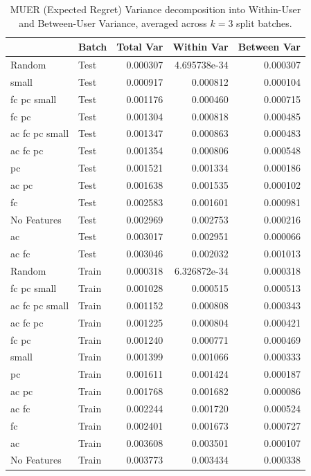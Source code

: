 \begin{table}[H]
\centering
\begin{tabular}{llrrr}
\toprule
           {} &  Batch &  Total Var &    Within Var &  Between Var \\
\midrule
         Random &   Test &   0.000307 &  4.695738e-34 &     0.000307 \\
          small &   Test &   0.000917 &  0.000812 &     0.000104 \\
    fc pc small &   Test &   0.001176 &  0.000460 &     0.000715 \\
         fc pc  &   Test &   0.001304 &  0.000818 &     0.000485 \\
 ac fc pc small &   Test &   0.001347 &  0.000863 &     0.000483 \\
      ac fc pc  &   Test &   0.001354 &  0.000806 &     0.000548 \\
            pc  &   Test &   0.001521 &  0.001334 &     0.000186 \\
         ac pc  &   Test &   0.001638 &  0.001535 &     0.000102 \\
            fc  &   Test &   0.002583 &  0.001601 &     0.000981 \\
    No Features &   Test &   0.002969 &  0.002753 &     0.000216 \\
            ac  &   Test &   0.003017 &  0.002951 &     0.000066 \\
         ac fc  &   Test &   0.003046 &  0.002032 &     0.001013 \\
\midrule
         Random &  Train &   0.000318 &  6.326872e-34 &     0.000318 \\
    fc pc small &  Train &   0.001028 &  0.000515 &     0.000513 \\
 ac fc pc small &  Train &   0.001152 &  0.000808 &     0.000343 \\
      ac fc pc  &  Train &   0.001225 &  0.000804 &     0.000421 \\
         fc pc  &  Train &   0.001240 &  0.000771 &     0.000469 \\
          small &  Train &   0.001399 &  0.001066 &     0.000333 \\
            pc  &  Train &   0.001611 &  0.001424 &     0.000187 \\
         ac pc  &  Train &   0.001768 &  0.001682 &     0.000086 \\
         ac fc  &  Train &   0.002244 &  0.001720 &     0.000524 \\
            fc  &  Train &   0.002401 &  0.001673 &     0.000727 \\
            ac  &  Train &   0.003608 &  0.003501 &     0.000107 \\
    No Features &  Train &   0.003773 &  0.003434 &     0.000338 \\
\bottomrule
\end{tabular}
\caption{MUER (Expected Regret) Variance decomposition into Within-User and Between-User Variance, averaged across $k = 3$ split batches.}
\label{MUER Variance Decomposition Table}
\end{table}

